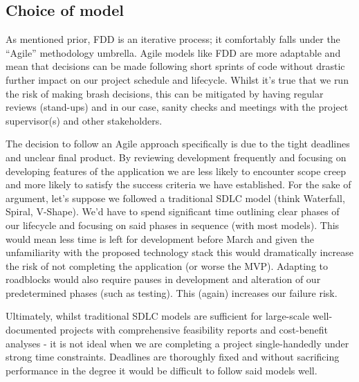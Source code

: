 \subsection{Choice of model}
As mentioned prior, FDD is an iterative process; it comfortably falls under the ``Agile'' methodology umbrella.
Agile models like FDD are more adaptable and mean that decisions can be made following short sprints of code without
drastic further impact on our project schedule and lifecycle. Whilst it's true that we run the risk of
making brash decisions, this can be mitigated by having regular reviews (stand-ups) and
in our case, sanity checks and meetings with the project supervisor(s) and other stakeholders.
\par
The decision to follow an Agile approach specifically is due to the tight deadlines and
unclear final product. By reviewing development frequently and focusing on developing features of the application we are
less likely to encounter scope creep and more likely to satisfy the success criteria we have established.
For the sake of argument, let's suppose we followed a traditional SDLC model (think Waterfall, Spiral, V-Shape).
We'd have to spend significant time outlining clear phases of our lifecycle and focusing on said phases in sequence (with most models).
This would mean less time is left for development before March and given the unfamiliarity with
the proposed technology stack this would dramatically increase the risk of not completing the application (or worse the MVP).
Adapting to roadblocks would also require pauses in development and alteration of our
predetermined phases (such as testing). This (again) increases our failure risk.
\par
Ultimately, whilst traditional SDLC models are sufficient for large-scale well-documented projects with
comprehensive feasibility reports and cost-benefit analyses - it is not ideal
when we are completing a project single-handedly under strong time constraints.
Deadlines are thoroughly fixed and without sacrificing performance
in the degree it would be difficult to follow said models well.
\pagebreak

